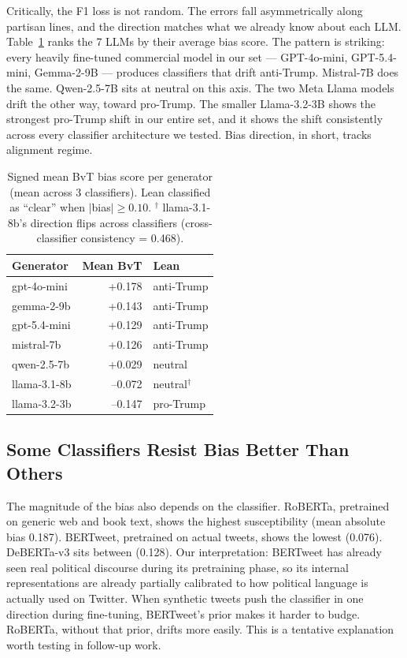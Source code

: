 \documentclass[11pt]{article}
\begin{document}
Critically, the F1 loss is not random. The errors fall asymmetrically along partisan lines, and the direction matches what we already know about each LLM. Table~\ref{tab:generator-lean} ranks the 7 LLMs by their average bias score. The pattern is striking: every heavily fine-tuned commercial model in our set --- GPT-4o-mini, GPT-5.4-mini, Gemma-2-9B --- produces classifiers that drift anti-Trump. Mistral-7B does the same. Qwen-2.5-7B sits at neutral on this axis. The two Meta Llama models drift the other way, toward pro-Trump. The smaller Llama-3.2-3B shows the strongest pro-Trump shift in our entire set, and it shows the shift consistently across every classifier architecture we tested. Bias direction, in short, tracks alignment regime.

\begin{table}[t]
\centering
\small
\begin{tabular}{lrl}
\toprule
\textbf{Generator} & \textbf{Mean BvT} & \textbf{Lean} \\
\midrule
gpt-4o-mini   & +0.178 & anti-Trump \\
gemma-2-9b    & +0.143 & anti-Trump \\
gpt-5.4-mini  & +0.129 & anti-Trump \\
mistral-7b    & +0.126 & anti-Trump \\
qwen-2.5-7b   & +0.029 & neutral \\
llama-3.1-8b  & --0.072 & neutral$^\dagger$ \\
llama-3.2-3b  & --0.147 & pro-Trump \\
\bottomrule
\end{tabular}
\caption{Signed mean BvT bias score per generator (mean across 3 classifiers). Lean classified as ``clear'' when $|$bias$| \geq 0.10$. $^\dagger$ llama-3.1-8b's direction flips across classifiers (cross-classifier consistency = 0.468).}
\label{tab:generator-lean}
\end{table}

\subsection{Some Classifiers Resist Bias Better Than Others}

The magnitude of the bias also depends on the classifier. RoBERTa, pretrained on generic web and book text, shows the highest susceptibility (mean absolute bias 0.187). BERTweet, pretrained on actual tweets, shows the lowest (0.076). DeBERTa-v3 sits between (0.128). Our interpretation: BERTweet has already seen real political discourse during its pretraining phase, so its internal representations are already partially calibrated to how political language is actually used on Twitter. When synthetic tweets push the classifier in one direction during fine-tuning, BERTweet's prior makes it harder to budge. RoBERTa, without that prior, drifts more easily. This is a tentative explanation worth testing in follow-up work.
\end{document}
